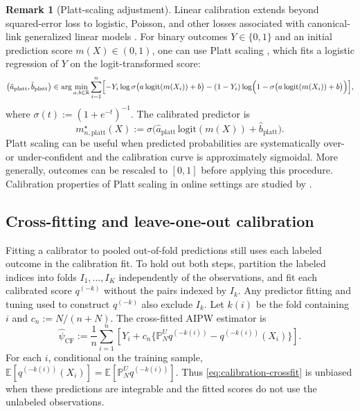 \documentclass{article}
\theoremstyle{plain}
\theoremstyle{definition}
\newtheorem{remark}{Remark}
\newcommand{\E}{\mathbb{E}}
\newcommand{\R}{\mathbb{R}}
\newcommand{\1}{\mathbbm{1}}
\newcommand{\mhat}{m}
\newcommand{\Pu}{\mathbb{P}^{U}_N}
\begin{document}
\begin{remark}[Platt-scaling adjustment]
Linear calibration extends beyond squared-error loss to
logistic, Poisson, and other losses associated with
canonical-link generalized linear models
\citep{rosenblum2009using}. For binary outcomes
$Y\in\{0,1\}$ and an initial prediction score
$\mhat(X)\in(0,1)$, one can use Platt scaling
\citep{cox1958two,platt1999probabilistic}, which fits a
logistic regression of $Y$ on the logit-transformed score:
\begin{equation}
\label{eq:platt-cal}
\bigl(\hat a_{\mathrm{platt}},\hat b_{\mathrm{platt}}\bigr)
\in
\arg\min_{a,b\in\R}
\sum_{i=1}^n
\Bigl[
-Y_i \log \sigma\bigl(a\,\mathrm{logit}(\mhat(X_i))+b\bigr)
-(1-Y_i)\log\Bigl(
1-\sigma\bigl(a\,\mathrm{logit}(\mhat(X_i))+b\bigr)
\Bigr)
\Bigr],
\end{equation}
where $\sigma(t):=(1+e^{-t})^{-1}$. The calibrated
predictor is
\[
m_{n,\mathrm{platt}}^\star(X)
:=
\sigma\bigl(
\hat a_{\mathrm{platt}}\,\mathrm{logit}(\mhat(X))
+\hat b_{\mathrm{platt}}
\bigr).
\]
Platt scaling can be useful when predicted probabilities
are systematically over- or under-confident and the
calibration curve is approximately sigmoidal. More
generally, outcomes can be rescaled to $[0,1]$ before
applying this procedure. Calibration properties of
Platt scaling in online settings are studied by
\citet{gupta2023online}.
\end{remark}

\subsection{Cross-fitting and leave-one-out calibration}
\label{sec:crossfit}

Fitting a calibrator to pooled out-of-fold predictions still uses each labeled
outcome in the calibration fit. To hold out both steps, partition the labeled
indices into folds \(I_1,\ldots,I_K\) independently of the observations, and
fit each calibrated score \(q^{(-k)}\) without the pairs indexed by \(I_k\).
Any predictor fitting and tuning used to construct \(q^{(-k)}\) also exclude
\(I_k\). Let \(k(i)\) be the fold containing \(i\) and
\(c_n:=N/(n+N)\). The cross-fitted AIPW estimator is
\begin{equation}
\label{eq:calibration-crossfit}
\widehat\psi_{\mathrm{CF}}
:=\frac1n\sum_{i=1}^n
\left[Y_i+c_n\{\Pu q^{(-k(i))}-q^{(-k(i))}(X_i)\}\right].
\end{equation}
For each \(i\), conditional on the training sample,
\(\E[q^{(-k(i))}(X_i)]=\E[\Pu q^{(-k(i))}]\).
Thus \eqref{eq:calibration-crossfit} is unbiased when these predictions are
integrable and the fitted scores do not use the unlabeled observations.
\end{document}
